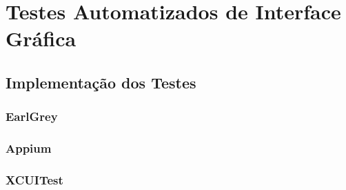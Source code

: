 \section{Testes Automatizados de Interface Gráfica}

\subsection{Implementação dos Testes}

\subsubsection{EarlGrey}

\subsubsection{Appium}

\subsubsection{XCUITest}
